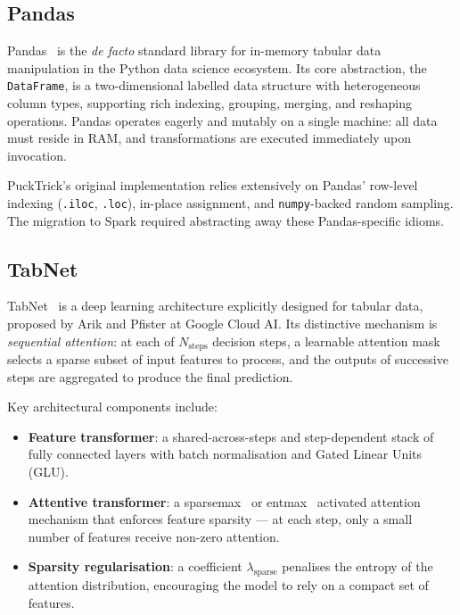 \subsection{Pandas}
\label{sec:tech-pandas}

Pandas~\cite{mckinney2010data} is the \emph{de facto} standard library for
in-memory tabular data manipulation in the Python data science ecosystem.  Its
core abstraction, the \texttt{DataFrame}, is a two-dimensional labelled data
structure with heterogeneous column types, supporting rich indexing, grouping,
merging, and reshaping operations.  Pandas operates eagerly and mutably on a
single machine: all data must reside in RAM, and transformations are executed
immediately upon invocation.

PuckTrick's original implementation relies extensively on Pandas' row-level
indexing (\texttt{.iloc}, \texttt{.loc}), in-place assignment, and
\texttt{numpy}-backed random sampling.  The migration to Spark required
abstracting away these Pandas-specific idioms.

\subsection{TabNet}
\label{sec:tech-tabnet}

TabNet~\cite{arik2021tabnet} is a deep learning architecture explicitly designed
for tabular data, proposed by Arik and Pfister at Google Cloud AI.  Its
distinctive mechanism is \emph{sequential attention}: at each of $N_{\text{steps}}$
decision steps, a learnable attention mask selects a sparse subset of input
features to process, and the outputs of successive steps are aggregated to
produce the final prediction.

Key architectural components include:
\begin{itemize}
    \item \textbf{Feature transformer}: a shared-across-steps and
          step-dependent stack of fully connected layers with batch
          normalisation and Gated Linear Units (GLU).
    \item \textbf{Attentive transformer}: a sparsemax~\cite{martins2016softmax}
          or entmax~\cite{peters2019sparse} activated attention mechanism that
          enforces feature sparsity — at each step, only a small number of
          features receive non-zero attention.
    \item \textbf{Sparsity regularisation}: a coefficient $\lambda_{\text{sparse}}$
          penalises the entropy of the attention distribution, encouraging the
          model to rely on a compact set of features.
\end{itemize}

